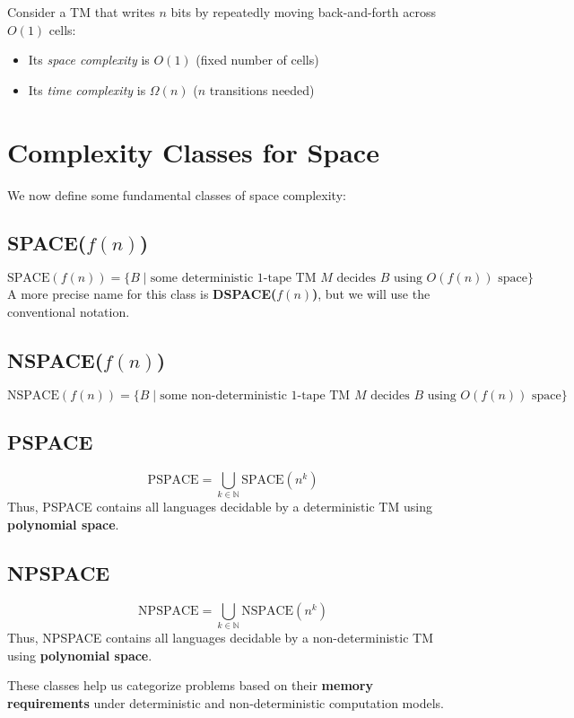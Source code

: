 \begin{example}
Consider a TM that writes $n$ bits by repeatedly moving back-and-forth across $O(1)$ cells:
\begin{itemize}
    \item Its \textit{space complexity} is $O(1)$ (fixed number of cells)
    \item Its \textit{time complexity} is $\Omega(n)$ ($n$ transitions needed)
\end{itemize}
\end{example}


\section{Complexity Classes for Space}

We now define some fundamental classes of space complexity:

\subsection{SPACE(\( f(n) \))}
\[
\text{SPACE}(f(n)) = \{ B \mid \text{some deterministic 1-tape TM } M \text{ decides } B \text{ using } O(f(n)) \text{ space} \}
\]
A more precise name for this class is \textbf{DSPACE(\( f(n) \))}, but we will use the conventional notation.

\subsection{NSPACE(\( f(n) \))}
\[
\text{NSPACE}(f(n)) = \{ B \mid \text{some non-deterministic 1-tape TM } M \text{ decides } B \text{ using } O(f(n)) \text{ space} \}
\]

\subsection{PSPACE}
\[
\text{PSPACE} = \bigcup_{k \in \mathbb{N}} \text{SPACE}(n^k)
\]
Thus, PSPACE contains all languages decidable by a deterministic TM using \textbf{polynomial space}.

\subsection{NPSPACE}
\[
\text{NPSPACE} = \bigcup_{k \in \mathbb{N}} \text{NSPACE}(n^k)
\]
Thus, NPSPACE contains all languages decidable by a non-deterministic TM using \textbf{polynomial space}.

These classes help us categorize problems based on their \textbf{memory requirements} under deterministic and non-deterministic computation models.

